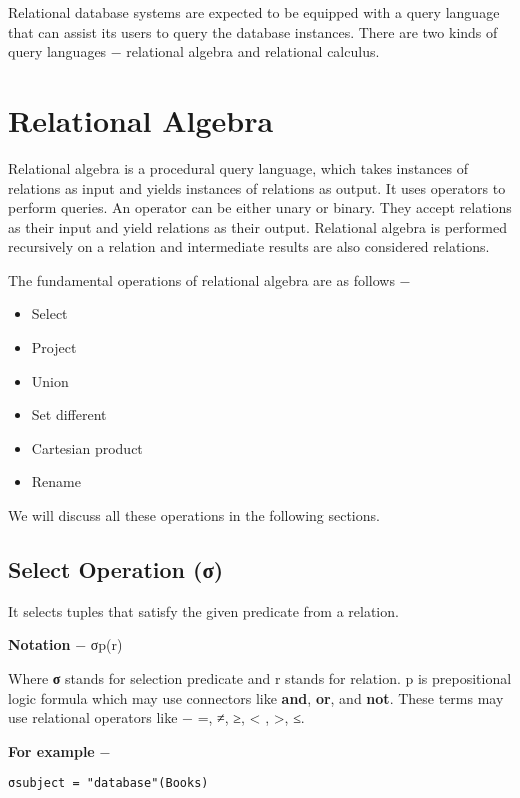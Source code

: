 \documentclass[]{article}
\date{}
\providecommand{\tightlist}{%
  \setlength{\itemsep}{0pt}\setlength{\parskip}{0pt}}
\begin{document}
Relational database systems are expected to be equipped with a query
language that can assist its users to query the database instances.
There are two kinds of query languages − relational algebra and
relational calculus.

\hypertarget{relational-algebra}{%
\section{Relational Algebra}\label{relational-algebra}}

Relational algebra is a procedural query language, which takes instances
of relations as input and yields instances of relations as output. It
uses operators to perform queries. An operator can be either unary or
binary. They accept relations as their input and yield relations as
their output. Relational algebra is performed recursively on a relation
and intermediate results are also considered relations.

The fundamental operations of relational algebra are as follows −

\begin{itemize}
\tightlist
\item
  Select
\item
  Project
\item
  Union
\item
  Set different
\item
  Cartesian product
\item
  Rename
\end{itemize}

We will discuss all these operations in the following sections.

\hypertarget{select-operation-ux3c3}{%
\subsection{Select Operation (σ)}\label{select-operation-ux3c3}}

It selects tuples that satisfy the given predicate from a relation.

\textbf{Notation} − σp(r)

Where \textbf{σ} stands for selection predicate and r stands for
relation. p is prepositional logic formula which may use connectors like
\textbf{and}, \textbf{or}, and \textbf{not}. These terms may use
relational operators like − =, ≠, ≥, \textless{} , \textgreater{}, ≤.

\textbf{For example} −

\begin{verbatim}
σsubject = "database"(Books)
\end{verbatim}
\end{document}
